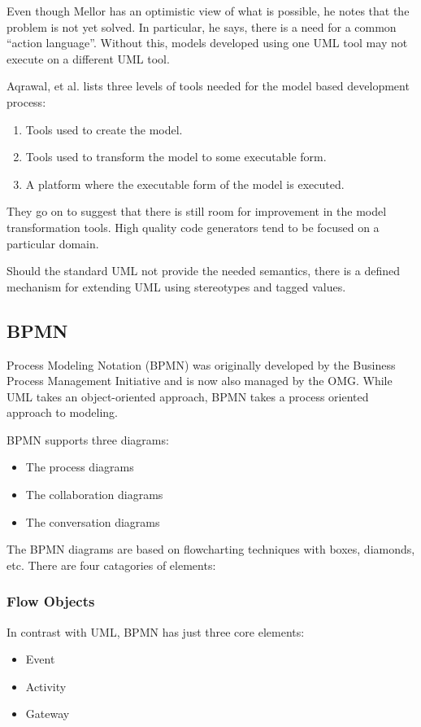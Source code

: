 \documentclass[10pt,journal,letterpaper,compsoc]{IEEEtran}
\begin{document}
Even though Mellor\cite{Mellor2007} has an optimistic view of what is possible, he notes that the problem is not yet solved.  In particular, he says, there is a need for a common ``action language''.  Without this, models developed using one UML tool may not execute on a different UML tool.

Aqrawal, et al.\cite{agrawal2002} lists three levels of tools needed for the model based development process:
\begin{enumerate}
  \item Tools used to create the model.
  \item Tools used to transform the model to some executable form.
  \item A platform where the executable form of the model is executed.
\end{enumerate}

They go on to suggest that there is still room for improvement in the model transformation tools.  High quality code generators tend to be focused on a particular domain.

Should the standard UML not provide the needed semantics, there is a defined mechanism\cite{UML-REF1999} for extending UML using stereotypes and tagged values.

\subsection{BPMN}
 Process Modeling Notation (BPMN) was originally developed by the Business Process Management Initiative\cite{White2004} and is now also managed by the OMG.  While UML takes an object-oriented approach, BPMN takes a process oriented approach to modeling\cite{BPMNFaq2011}.

BPMN supports three diagrams\cite{BPMN20}:
\begin{itemize}
  \item The process diagrams
  \item The collaboration diagrams
  \item The conversation diagrams
\end{itemize}

The BPMN diagrams are based on flowcharting techniques\cite{White2004} with boxes, diamonds, etc.  There are four catagories of elements:

\subsubsection{Flow Objects}
In contrast with UML, BPMN has just three core elements:
\begin{itemize}
  \item Event
  \item Activity
  \item Gateway
\end{itemize}
\end{document}
